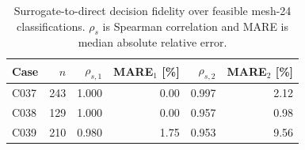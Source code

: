 \begin{table}[t]
\centering
\caption{Surrogate-to-direct decision fidelity over feasible mesh-24 classifications. $\rho_s$ is Spearman correlation and MARE is median absolute relative error.}
\label{tab:decision_fidelity_fast}
\begin{tabular}{lrrrrr}
\toprule
Case & $n$ & $\rho_{s,1}$ & MARE$_1$ [\%] & $\rho_{s,2}$ & MARE$_2$ [\%] \\
\midrule
C037 & 243 & 1.000 & 0.00 & 0.997 & 2.12 \\
C038 & 129 & 1.000 & 0.00 & 0.957 & 0.98 \\
C039 & 210 & 0.980 & 1.75 & 0.953 & 9.56 \\
\bottomrule
\end{tabular}
\end{table}
